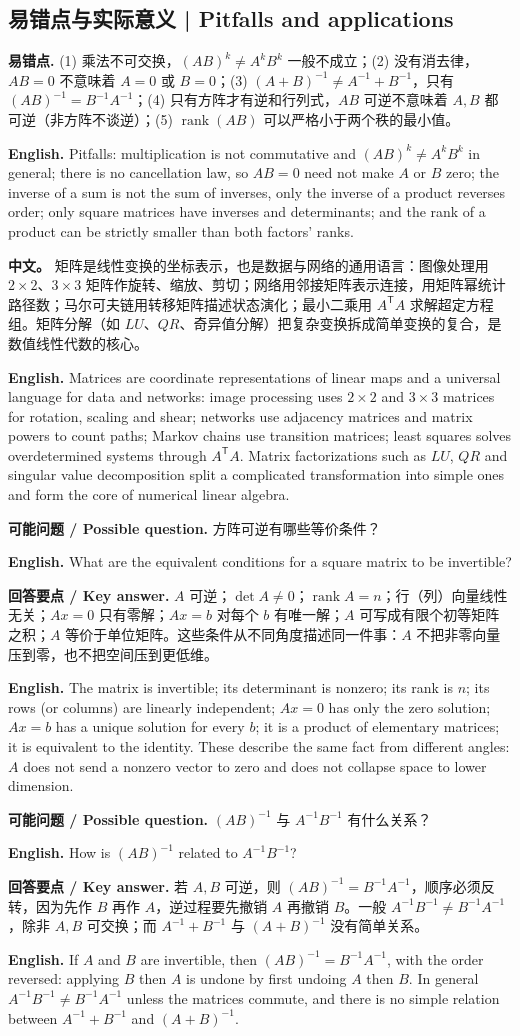 \documentclass[UTF8,11pt,a4paper]{ctexart}
\newcommand{\EN}[1]{\par\noindent\textbf{English.} #1\par}
\newcommand{\ASK}[4]{\par\noindent\textbf{可能问题 / Possible question.} #1\par\EN{#2}\noindent\textbf{回答要点 / Key answer.} #3\par\EN{#4}\medskip}
\newcommand{\APS}[2]{\par\noindent\textbf{中文。} #1\par\noindent\textbf{English.} #2\par\smallskip}
\begin{document}
\subsection{易错点与实际意义 | Pitfalls and applications}
\noindent\textbf{易错点.} (1) 乘法不可交换，$(AB)^k\ne A^kB^k$ 一般不成立；(2) 没有消去律，$AB=0$ 不意味着 $A=0$ 或 $B=0$；(3) $(A+B)^{-1}\ne A^{-1}+B^{-1}$，只有 $(AB)^{-1}=B^{-1}A^{-1}$；(4) 只有方阵才有逆和行列式，$AB$ 可逆不意味着 $A,B$ 都可逆（非方阵不谈逆）；(5) $\operatorname{rank}(AB)$ 可以严格小于两个秩的最小值。
\EN{Pitfalls: multiplication is not commutative and $(AB)^k\ne A^kB^k$ in general; there is no cancellation law, so $AB=0$ need not make $A$ or $B$ zero; the inverse of a sum is not the sum of inverses, only the inverse of a product reverses order; only square matrices have inverses and determinants; and the rank of a product can be strictly smaller than both factors' ranks.}
\APS{矩阵是线性变换的坐标表示，也是数据与网络的通用语言：图像处理用 $2\times2$、$3\times3$ 矩阵作旋转、缩放、剪切；网络用邻接矩阵表示连接，用矩阵幂统计路径数；马尔可夫链用转移矩阵描述状态演化；最小二乘用 $A^{\mathsf T}A$ 求解超定方程组。矩阵分解（如 $LU$、$QR$、奇异值分解）把复杂变换拆成简单变换的复合，是数值线性代数的核心。}{Matrices are coordinate representations of linear maps and a universal language for data and networks: image processing uses $2\times2$ and $3\times3$ matrices for rotation, scaling and shear; networks use adjacency matrices and matrix powers to count paths; Markov chains use transition matrices; least squares solves overdetermined systems through $A^{\mathsf T}A$. Matrix factorizations such as $LU$, $QR$ and singular value decomposition split a complicated transformation into simple ones and form the core of numerical linear algebra.}
\ASK{方阵可逆有哪些等价条件？}{What are the equivalent conditions for a square matrix to be invertible?}{$A$ 可逆；$\det A\ne0$；$\operatorname{rank}A=n$；行（列）向量线性无关；$Ax=0$ 只有零解；$Ax=b$ 对每个 $b$ 有唯一解；$A$ 可写成有限个初等矩阵之积；$A$ 等价于单位矩阵。这些条件从不同角度描述同一件事：$A$ 不把非零向量压到零，也不把空间压到更低维。}{The matrix is invertible; its determinant is nonzero; its rank is $n$; its rows (or columns) are linearly independent; $Ax=0$ has only the zero solution; $Ax=b$ has a unique solution for every $b$; it is a product of elementary matrices; it is equivalent to the identity. These describe the same fact from different angles: $A$ does not send a nonzero vector to zero and does not collapse space to lower dimension.}
\ASK{$(AB)^{-1}$ 与 $A^{-1}B^{-1}$ 有什么关系？}{How is $(AB)^{-1}$ related to $A^{-1}B^{-1}$?}{若 $A,B$ 可逆，则 $(AB)^{-1}=B^{-1}A^{-1}$，顺序必须反转，因为先作 $B$ 再作 $A$，逆过程要先撤销 $A$ 再撤销 $B$。一般 $A^{-1}B^{-1}\ne B^{-1}A^{-1}$，除非 $A,B$ 可交换；而 $A^{-1}+B^{-1}$ 与 $(A+B)^{-1}$ 没有简单关系。}{If $A$ and $B$ are invertible, then $(AB)^{-1}=B^{-1}A^{-1}$, with the order reversed: applying $B$ then $A$ is undone by first undoing $A$ then $B$. In general $A^{-1}B^{-1}\ne B^{-1}A^{-1}$ unless the matrices commute, and there is no simple relation between $A^{-1}+B^{-1}$ and $(A+B)^{-1}$.}
\end{document}

